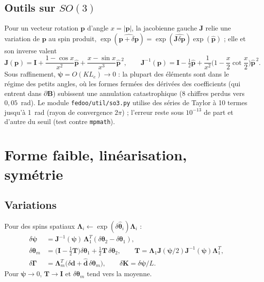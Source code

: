 \documentclass[11pt,a4paper]{article}
\newcommand{\hatv}[1]{\widehat{\bm{#1}}}
\newcommand{\Lam}{\bm{\Lambda}}
\newcommand{\Gam}{\bm{\Gamma}}
\newcommand{\Kv}{\mathbf{K}}
\newcommand{\code}[1]{\texttt{#1}}
\begin{document}
\subsection{Outils sur $SO(3)$}
Pour un vecteur rotation $\mathbf p$ d'angle $x=|\mathbf p|$, la jacobienne gauche
$\mathbf J$ relie une variation de $\mathbf p$ au spin produit,
$\exp(\widehat{\mathbf p+\delta\mathbf p})=\exp(\widehat{\mathbf J\delta\mathbf p})\exp(\hatv p)$ ;
elle et son inverse valent
\begin{equation}
\mathbf J(\mathbf p)=\mathbf I+\frac{1-\cos x}{x^2}\hatv p+\frac{x-\sin x}{x^3}\hatv p^{\,2},\qquad
\mathbf J^{-1}(\mathbf p)=\mathbf I-\tfrac12\hatv p+\frac1{x^2}\Big(1-\frac x2\cot\frac x2\Big)\hatv p^{\,2}.
\end{equation}
Sous raffinement, $\bm\psi=O(KL_e)\to0$ : la plupart des éléments sont dans le
régime des petits angles, où les formes fermées des dérivées des coefficients
(qui entrent dans $\partial\mathbf B$) subissent une annulation catastrophique
(8 chiffres perdus vers $0{,}05$~rad). Le module \code{fedoo/util/so3.py} utilise
des séries de Taylor à 10 termes jusqu'à 1~rad (rayon de convergence $2\pi$) ;
l'erreur reste sous $10^{-13}$ de part et d'autre du seuil (test contre
\code{mpmath}).

\section{Forme faible, linéarisation, symétrie}

\subsection{Variations}
Pour des spins spatiaux $\Lam_i\leftarrow\exp(\delta\hatv\theta_i)\Lam_i$ :
\begin{align}
\delta\bm\psi&=\mathbf J^{-1}(\bm\psi)\,\Lam_1^T(\delta\bm\theta_2-\delta\bm\theta_1),\\
\delta\bm\theta_m&=\Big(\mathbf I-\tfrac12\mathbf T\Big)\delta\bm\theta_1+\tfrac12\mathbf T\,\delta\bm\theta_2,
\qquad \mathbf T=\Lam_1\mathbf J(\bm\psi/2)\mathbf J^{-1}(\bm\psi)\Lam_1^T,\\
\delta\Gam&=\Lam_m^T\big(\delta\mathbf d+\hatv d\,\delta\bm\theta_m\big),\qquad
\delta\Kv=\delta\bm\psi/L .
\end{align}
Pour $\bm\psi\to0$, $\mathbf T\to\mathbf I$ et $\delta\bm\theta_m$ tend vers la
moyenne.
\end{document}
